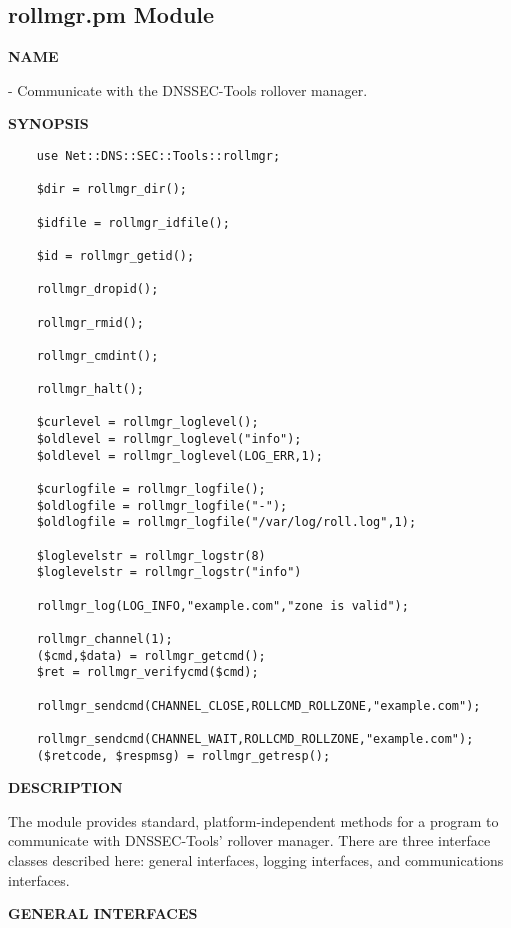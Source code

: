 \clearpage

\subsection{\bf rollmgr.pm Module}

{\bf NAME}

 - Communicate with the DNSSEC-Tools rollover manager.

{\bf SYNOPSIS}

\begin{verbatim}
    use Net::DNS::SEC::Tools::rollmgr;

    $dir = rollmgr_dir();

    $idfile = rollmgr_idfile();

    $id = rollmgr_getid();

    rollmgr_dropid();

    rollmgr_rmid();

    rollmgr_cmdint();

    rollmgr_halt();

    $curlevel = rollmgr_loglevel();
    $oldlevel = rollmgr_loglevel("info");
    $oldlevel = rollmgr_loglevel(LOG_ERR,1);

    $curlogfile = rollmgr_logfile();
    $oldlogfile = rollmgr_logfile("-");
    $oldlogfile = rollmgr_logfile("/var/log/roll.log",1);

    $loglevelstr = rollmgr_logstr(8)
    $loglevelstr = rollmgr_logstr("info")

    rollmgr_log(LOG_INFO,"example.com","zone is valid");

    rollmgr_channel(1);
    ($cmd,$data) = rollmgr_getcmd();
    $ret = rollmgr_verifycmd($cmd);

    rollmgr_sendcmd(CHANNEL_CLOSE,ROLLCMD_ROLLZONE,"example.com");

    rollmgr_sendcmd(CHANNEL_WAIT,ROLLCMD_ROLLZONE,"example.com");
    ($retcode, $respmsg) = rollmgr_getresp();
\end{verbatim}

\clearpage
{\bf DESCRIPTION}

The  module provides standard,
platform-independent methods for a program to communicate with DNSSEC-Tools'
 rollover manager.  There are three interface classes described
here:  general interfaces, logging interfaces, and communications interfaces.

{\bf GENERAL INTERFACES}

